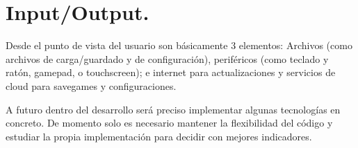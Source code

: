 
\section{Input/Output.}\label{io:input-output}
Desde el punto de vista del usuario son básicamente 3 elementos: Archivos (como archivos de carga/guardado y de configuración), periféricos (como teclado y ratón, gamepad, o touchscreen); e internet para actualizaciones y servicios de cloud para savegames y configuraciones.

A futuro dentro del desarrollo será preciso implementar algunas tecnologías en concreto. De momento solo es necesario mantener la flexibilidad del código y estudiar la propia implementación para decidir con mejores indicadores.